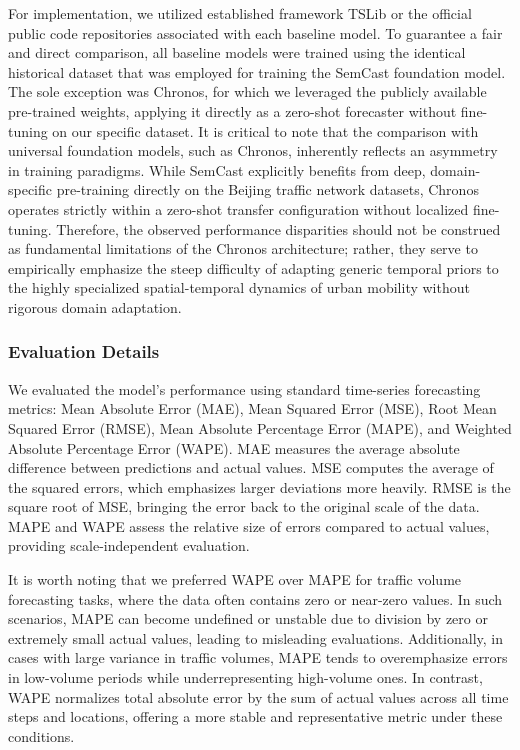 \documentclass{article}
\begin{document}
For implementation, we utilized established framework TSLib \cite{wu_timesnet_2023,wang2024tssurvey} or the official public code repositories associated with each baseline model. To guarantee a fair and direct comparison, all baseline models were trained using the identical historical dataset that was employed for training the SemCast foundation model. The sole exception was Chronos, for which we leveraged the publicly available pre-trained weights, applying it directly as a zero-shot forecaster without fine-tuning on our specific dataset. It is critical to note that the comparison with universal foundation models, such as Chronos, inherently reflects an asymmetry in training paradigms. While SemCast explicitly benefits from deep, domain-specific pre-training directly on the Beijing traffic network datasets, Chronos operates strictly within a zero-shot transfer configuration without localized fine-tuning. Therefore, the observed performance disparities should not be construed as fundamental limitations of the Chronos architecture; rather, they serve to empirically emphasize the steep difficulty of adapting generic temporal priors to the highly specialized spatial-temporal dynamics of urban mobility without rigorous domain adaptation.

\subsubsection{Evaluation Details}
We evaluated the model's performance using standard time-series forecasting metrics: Mean Absolute Error (MAE), Mean Squared Error (MSE), Root Mean Squared Error (RMSE), Mean Absolute Percentage Error (MAPE), and Weighted Absolute Percentage Error (WAPE). MAE measures the average absolute difference between predictions and actual values. MSE computes the average of the squared errors, which emphasizes larger deviations more heavily. RMSE is the square root of MSE, bringing the error back to the original scale of the data. MAPE and WAPE assess the relative size of errors compared to actual values, providing scale-independent evaluation.

It is worth noting that we preferred WAPE over MAPE for traffic volume forecasting tasks, where the data often contains zero or near-zero values. In such scenarios, MAPE can become undefined or unstable due to division by zero or extremely small actual values, leading to misleading evaluations. Additionally, in cases with large variance in traffic volumes, MAPE tends to overemphasize errors in low-volume periods while underrepresenting high-volume ones. In contrast, WAPE normalizes total absolute error by the sum of actual values across all time steps and locations, offering a more stable and representative metric under these conditions.
\end{document}

